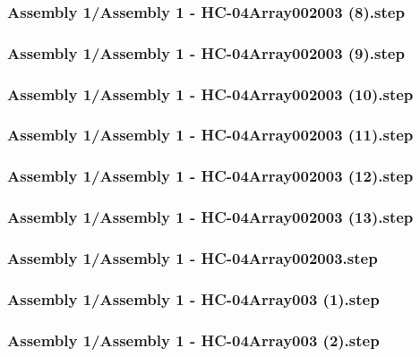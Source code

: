 \documentclass[a4paper,12pt]{article}
\begin{document}
\begin{lstlising}[language=C++]
\subsubsection{Assembly 1/Assembly 1 - HC-04Array002003 (8).step}

\subsubsection{Assembly 1/Assembly 1 - HC-04Array002003 (9).step}

\subsubsection{Assembly 1/Assembly 1 - HC-04Array002003 (10).step}

\subsubsection{Assembly 1/Assembly 1 - HC-04Array002003 (11).step}

\subsubsection{Assembly 1/Assembly 1 - HC-04Array002003 (12).step}

\subsubsection{Assembly 1/Assembly 1 - HC-04Array002003 (13).step}

\subsubsection{Assembly 1/Assembly 1 - HC-04Array002003.step}

\subsubsection{Assembly 1/Assembly 1 - HC-04Array003 (1).step}

\subsubsection{Assembly 1/Assembly 1 - HC-04Array003 (2).step}


\end{lstlising}
\end{document}
